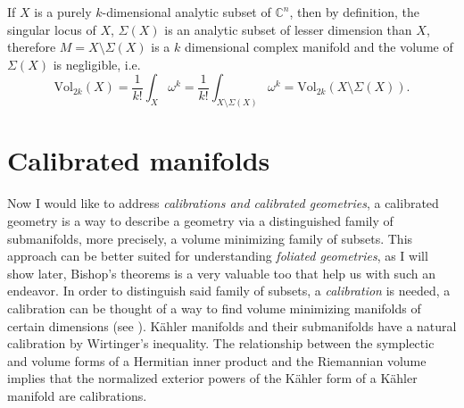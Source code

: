 \documentclass[12pt,twoside,a4paper]{report}
\newcommand{\con}{\ensuremath{\mathbb{C}^n}}
\newcommand{\sig}{\ensuremath{\Sigma}}
\begin{document}
  If $X$ is a purely $k$-dimensional analytic subset of $\con$, then by definition, the singular locus of $X$, $\sig(X)$ is an analytic subset of lesser dimension than $X$, therefore $M=X\setminus\sig(X)$ is a $k$ dimensional complex manifold and the volume of $\sig(X)$ is negligible, i.e.
  \[
      \textrm{Vol}_{2k}(X)= \frac{1}{k!}\int_{X} \omega^k= \frac{1}{k!}\int_{X\setminus\sig(X)} \omega^k=
      \textrm{Vol}_{2k}(X\setminus\sig(X)).
  \]


  \section{Calibrated manifolds}
  Now I would like to address \emph{calibrations and calibrated geometries}, a calibrated geometry is a way to describe a geometry via a distinguished family of submanifolds, more precisely, a volume minimizing family of subsets. This approach can be better suited for understanding \emph{foliated geometries}, as I will show later, Bishop's theorems is a very valuable too that help us with such an endeavor.
  In order to distinguish said family of subsets, a \emph{calibration} is needed, a calibration can be thought of a way to find volume minimizing manifolds of certain dimensions (see \cite{Harvey}). K\"ahler manifolds and their submanifolds have a natural calibration by Wirtinger's inequality. The relationship between the symplectic and volume forms of a Hermitian inner product and the Riemannian volume implies that the normalized exterior powers of the Kähler form of a Kähler manifold are calibrations.
\end{document}
